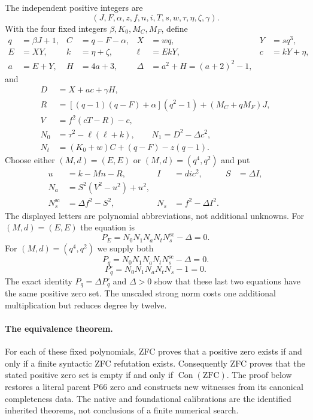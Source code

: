 The independent positive integers are
\[
 (J,F,\alpha,z,f,n,i,T,s,w,\tau,\eta,\zeta,\gamma).
\]
With the four fixed integers $\beta,K_0,M_C,M_F$, define
\begin{align*}
q&=\beta J+1,&C&=q-F-\alpha,&X&=wq,&Y&=sq^3,\\
E&=XY,&k&=\eta+\zeta,&\ell&=EkY,&c&=kY+\eta,\\
a&=E+Y,&H&=4a+3,&\Delta&=a^2+H=(a+2)^2-1,
\end{align*}
and
\begin{align*}
D&=X+ac+\gamma H,\\
R&=[(q-1)(q-F)+\alpha](q^2-1)+(M_C+qM_F)J,\\
V&=f^2(cT-R)-c,\\
N_0&=\tau^2-\ell(\ell+k),\qquad N_1=D^2-\Delta c^2,\\
N_t&=(K_0+w)C+(q-F)-z(q-1).
\end{align*}
Choose either $(M,d)=(E,E)$ or $(M,d)=(q^4,q^2)$ and put
\begin{align*}
u&=k-Mn-R,&I&=dic^2,&S&=\Delta I,\\
N_a&=S^2(V^2-u^2)+u^2,\\
N_s^{\mathrm{sc}}&=\Delta f^2-S^2,&N_s&=f^2-\Delta I^2.
\end{align*}
The displayed letters are polynomial abbreviations, not additional
unknowns. For $(M,d)=(E,E)$ the equation is
\begin{equation}\label{eq:ordinate66}
 \boxed{P_E=N_0N_1N_aN_tN_s^{\mathrm{sc}}-\Delta=0.}
\end{equation}
For $(M,d)=(q^4,q^2)$ we supply both
\begin{equation}\label{eq:ordinate67}
 P_q=N_0N_1N_aN_tN_s^{\mathrm{sc}}-\Delta=0.
\end{equation}
\begin{equation}\label{eq:ordinate68}
 \boxed{P_q^{\circ}=N_0N_1N_aN_tN_s-1=0.}
\end{equation}
The exact identity $P_q=\Delta P_q^{\circ}$ and $\Delta>0$ show that
these last two equations have the same positive zero set. The unscaled
strong norm costs one additional multiplication but reduces degree by twelve.

\paragraph{The equivalence theorem.}
For each of these fixed polynomials, ZFC proves that a positive zero exists
if and only if a finite syntactic ZFC refutation exists. Consequently ZFC
proves that the stated positive zero set is empty if and only if
$\operatorname{Con}(\mathrm{ZFC})$.
The proof below restores a literal parent P66 zero and constructs new
witnesses from its canonical completeness data. The native and foundational
calibrations are the identified inherited theorems, not conclusions of a
finite numerical search.


